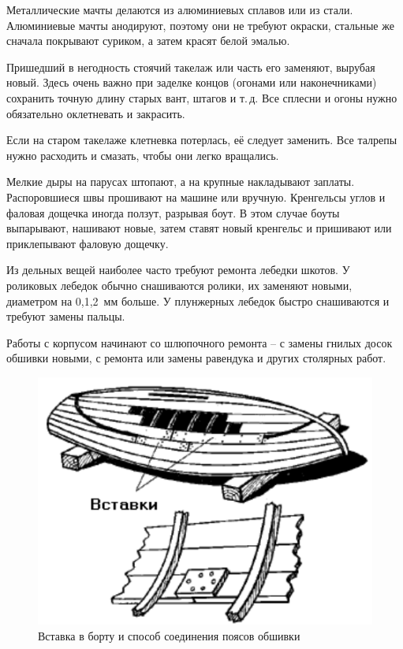 \documentclass[a4paper, 12pt, twoside, final]{scrbook}
\begin{document}
Металлические мачты делаются из алюминиевых сплавов или из стали. Алюминиевые мачты анодируют, поэтому они не требуют окраски, стальные же сначала покрывают суриком, а затем красят белой эмалью.

Пришедший в негодность стоячий такелаж или часть его заменяют, вырубая новый. Здесь очень важно при заделке концов (огонами или наконечниками) сохранить точную длину старых вант, штагов и т.\,д. Все сплесни и огоны нужно обязательно оклетневать и закрасить. 

Если на старом такелаже клетневка потерлась, её следует заменить. Все талрепы нужно расходить и смазать, чтобы они легко вращались.

Мелкие дыры на парусах штопают, а на крупные накладывают заплаты. Распоровшиеся швы прошивают на машине или вручную. Кренгельсы углов и фаловая дощечка иногда ползут, разрывая боут. В этом случае боуты выпарывают, нашивают новые, затем ставят новый кренгельс и пришивают или приклепывают фаловую дощечку.

Из дельных вещей наиболее часто требуют ремонта лебедки шкотов. У роликовых лебедок обычно снашиваются ролики, их заменяют новыми, диаметром на 0,1,2~мм больше. У плунжерных лебедок быстро снашиваются и требуют замены пальцы.

Работы с корпусом начинают со шлюпочного ремонта \--- с замены гнилых досок обшивки новыми, с ремонта или замены равендука и других столярных работ.

\begin{figure}
   \centering
   \includegraphics{73_Vstavka} %
   \caption{Вставка в борту и способ соединения поясов обшивки}
   \label{fig:73}
\end{figure}
\end{document}
